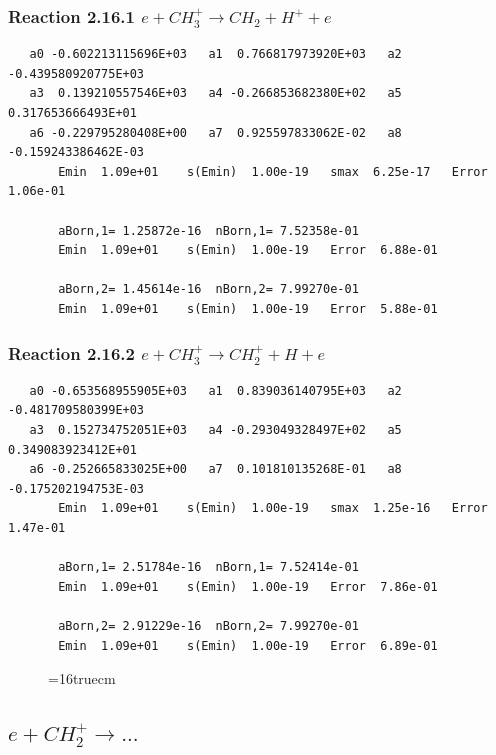 \documentclass[12pt,dvipdfmx]{article}
\begin{document}
\subsubsection{
Reaction 2.16.1   $e + CH_3^+ \rightarrow CH_2 + H^+ + e $
}

\begin{small}\begin{verbatim}
   a0 -0.602213115696E+03   a1  0.766817973920E+03   a2 -0.439580920775E+03
   a3  0.139210557546E+03   a4 -0.266853682380E+02   a5  0.317653666493E+01
   a6 -0.229795280408E+00   a7  0.925597833062E-02   a8 -0.159243386462E-03
       Emin  1.09e+01    s(Emin)  1.00e-19   smax  6.25e-17   Error  1.06e-01

       aBorn,1= 1.25872e-16  nBorn,1= 7.52358e-01
       Emin  1.09e+01    s(Emin)  1.00e-19   Error  6.88e-01

       aBorn,2= 1.45614e-16  nBorn,2= 7.99270e-01
       Emin  1.09e+01    s(Emin)  1.00e-19   Error  5.88e-01
\end{verbatim}\end{small}

\subsubsection{
Reaction 2.16.2   $e + CH_3^+ \rightarrow CH_2^+ + H + e $
}

\begin{small}\begin{verbatim}
   a0 -0.653568955905E+03   a1  0.839036140795E+03   a2 -0.481709580399E+03
   a3  0.152734752051E+03   a4 -0.293049328497E+02   a5  0.349083923412E+01
   a6 -0.252665833025E+00   a7  0.101810135268E-01   a8 -0.175202194753E-03
       Emin  1.09e+01    s(Emin)  1.00e-19   smax  1.25e-16   Error  1.47e-01

       aBorn,1= 2.51784e-16  nBorn,1= 7.52414e-01
       Emin  1.09e+01    s(Emin)  1.00e-19   Error  7.86e-01

       aBorn,2= 2.91229e-16  nBorn,2= 7.99270e-01
       Emin  1.09e+01    s(Emin)  1.00e-19   Error  6.89e-01
\end{verbatim}\end{small}

\begin{figure} \label{met.1_2.16}
\epsfxsize=16truecm
\end{figure}
\newpage

\subsection{
$e + CH_2^+ \rightarrow ... $
}
\end{document}
